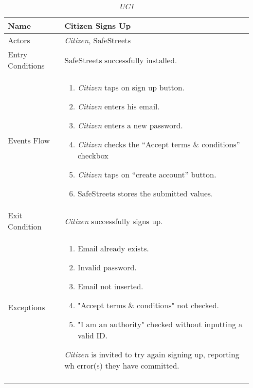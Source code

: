 \documentclass[../../../RASD.tex]{subfiles}
\begin{document}
    \begin{center}
        \begin{longtable}{| p{.35\linewidth} | p{.65\linewidth} |}

            \hline
            \textbf{Name} & \textbf{Citizen Signs Up}\\ \hline
            Actors & \textit{Citizen}, SafeStreets\\ \hline
            Entry Conditions & SafeStreets successfully installed.\\ \hline
            Events Flow &
            \begin{enumerate}
                \item \textit{Citizen} taps on sign up button.
                \item \textit{Citizen} enters his email.
                \item \textit{Citizen} enters a new password.
                \item \textit{Citizen} checks the “Accept terms \& conditions” checkbox
                \item \textit{Citizen} taps on “create account” button.
                \item SafeStreets stores the submitted values.
            \end{enumerate}
            \\ \hline
            Exit Condition & \textit{Citizen} successfully signs up.\\ \hline
            Exceptions &
            \begin{enumerate}
                \item Email already exists.
                \item Invalid password.
                \item Email not inserted.
                \item "Accept terms \& conditions" not checked.
                \item "I am an authority" checked without inputting a valid ID.
            \end{enumerate}
            \textit{Citizen} is invited to try again signing up, reporting wh error(s) they have committed. \\
            \hline
            \caption[\textit{Use Case 1}]{\textit{UC1}}
        \end{longtable}
    \end{center}
    \newpage
\end{document}
